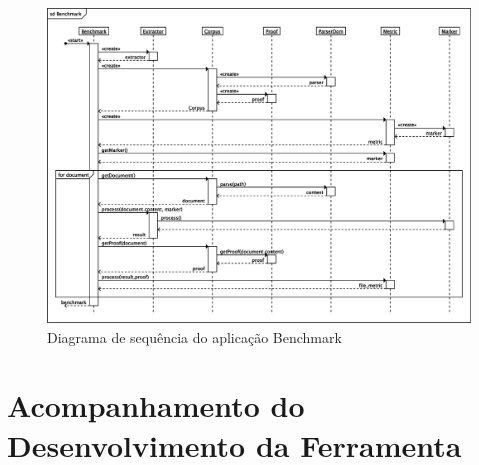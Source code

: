 \documentclass[12pt, a4paper]{article}
\begin{document}
\begin{figure}[htb!]
  \begin{center}
  \includegraphics[width=14cm]{img/fastbenchmark.eps}
  \caption{Diagrama de sequência do aplicação Benchmark}
  \label{sequencia}
  \end{center}
\end{figure}

\section{Acompanhamento do Desenvolvimento da Ferramenta}
\end{document}
